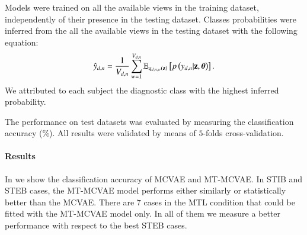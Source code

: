 Models were trained on all the available views in the training dataset, independently of their presence in the testing dataset.
Classes probabilities were inferred from the all the available views in the testing dataset with the following equation:
\begin{equation}\label{eq:reconstructiony}
\begin{aligned}
\hat{y}_{d,n} = \frac{1}{V_{d, n}} \sum_{w=1}^{V_{d, n}} \operatorname{\mathbb{E}}_{q_{d,n,w}(\mathbf{z})}\left[p\left(y_{d,n}|\mathbf{z},\boldsymbol{\theta}\right)\right].
\end{aligned}
\end{equation}
We attributed to each subject the diagnostic class with the highest inferred probability.

The performance on test datasets was evaluated by measuring the classification accuracy (\%).
All results were validated by means of $5$-folds cross-validation.

\paragraph{Results}
In  we show the classification accuracy of MCVAE and MT-MCVAE.
In STIB and STEB cases, the MT-MCVAE model performs either similarly or statistically better than the MCVAE.
There are $7$ cases in the MTL condition  that could be fitted with the MT-MCVAE model only.
In all of them we measure a better performance with respect to the best STEB cases.

